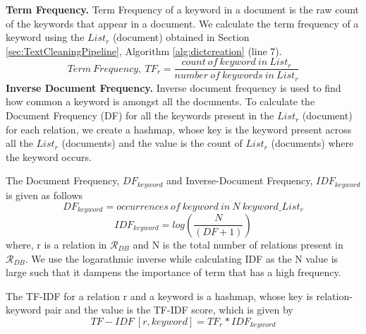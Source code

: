\textbf{Term Frequency.} Term Frequency of a keyword in a document is the raw count of the keywords that appear in a document. We calculate the term frequency of a keyword using the $List_{r}$ (document) obtained in Section \ref{sec:TextCleaningPipeline}, Algorithm \ref{alg:dictcreation} (line 7).
\begin{equation}
Term \ Frequency, \ TF_{r} = \frac{count \ of \ keyword \ in \ List_{r}}{number \ of \ keywords \ in \ List_{r}}
\end{equation}
\textbf{Inverse Document Frequency.}
Inverse document frequency is used to find how common a keyword is amongst all the documents. To calculate the Document Frequency (DF) for all the keywords present in the $List_{r}$ (document) for each relation, we create a hashmap, whose key is the keyword present across all the $List_{r}$ (documents) and the value is the count of $List_{r}$ (documents) where the keyword occurs.

The Document Frequency, $DF_{keyword}$ and Inverse-Document Frequency, $IDF_{keyword}$ is given as follows
\begin{equation}
   DF_{keyword} = occurrences \ of \ keyword \ in \ N \ keyword\_List_{r}
\end{equation}
\begin{equation}
      IDF_{keyword} = log\left( \frac{N}{(DF+1)} \right)
\end{equation}
where, r is a relation in $\mathcal{R}_{DB}$ and  N is the total number of relations present in $\mathcal{R}_{DB}$. We use the logarathmic inverse while calculating IDF as the N value is large such that it dampens the importance of term that has a high frequency. 

The TF-IDF for a relation r and a keyword is a hashmap, whose key is relation-keyword pair and the value is the TF-IDF score, which is given by
\begin{equation}
      TF-IDF \ [r,keyword] = TF_{r}*IDF_{keyword}
\end{equation}

